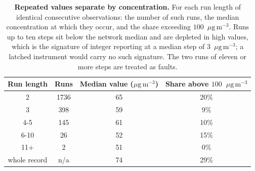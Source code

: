 \documentclass[11pt]{article}
\newcommand*{\ugm}{\ensuremath{\mu\mathrm{g\,m^{-3}}}}
\begin{document}
\begin{table}[htbp]\centering\footnotesize
\caption{\textbf{Repeated values separate by concentration.} For each run length of identical consecutive observations: the number of such runs, the median concentration at which they occur, and the share exceeding $100$~\ugm{}. Runs up to ten steps sit below the network median and are depleted in high values, which is the signature of integer reporting at a median step of $3$~\ugm{}; a latched instrument would carry no such signature. The two runs of eleven or more steps are treated as faults.}
\label{si:t33}
\begin{tabular}{cccc}\toprule
Run length & Runs & Median value (\ugm) & Share above $100$~\ugm \\ \midrule
2 & 1736 & 65 & 20\% \\
3 & 398 & 59 & 9\% \\
4-5 & 145 & 61 & 10\% \\
6-10 & 26 & 52 & 15\% \\
11+ & 2 & 51 & 0\% \\
\midrule
whole record & n/a & 74 & 29\% \\
\bottomrule\end{tabular}\end{table}
\end{document}
